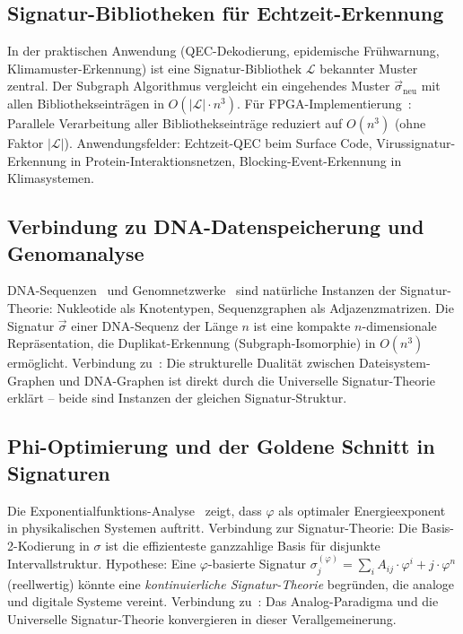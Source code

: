 ﻿\documentclass[a4paper,12pt]{article}
\theoremstyle{definition}
\begin{document}
\subsection{Signatur-Bibliotheken f\"ur Echtzeit-Erkennung}

In der praktischen Anwendung (QEC-Dekodierung, epidemische Fr\"uhwarnung,
Klimamuster-Erkennung) ist eine Signatur-Bibliothek $\mathcal{L}$
bekannter Muster zentral.
Der Subgraph Algorithmus vergleicht ein eingehendes Muster $\vec{\sigma}_{\text{neu}}$
mit allen Bibliothekseintr\"agen in $O(|\mathcal{L}| \cdot n^3)$.
F\"ur FPGA-Implementierung~\cite{epp2026fpga}: Parallele Verarbeitung aller
Bibliothekseintr\"age reduziert auf $O(n^3)$ (ohne Faktor $|\mathcal{L}|$).
Anwendungsfelder: Echtzeit-QEC beim Surface Code, Virussignatur-Erkennung
in Protein-Interaktionsnetzen, Blocking-Event-Erkennung in Klimasystemen.

\subsection{Verbindung zu DNA-Datenspeicherung und Genomanalyse}

DNA-Sequenzen~\cite{epp2026dna} und Genomnetzwerke~\cite{epp2026gen}
sind nat\"urliche Instanzen der Signatur-Theorie: Nukleotide als
Knotentypen, Sequenzgraphen als Adjazenzmatrizen.
Die Signatur $\vec{\sigma}$ einer DNA-Sequenz der L\"ange $n$ ist eine
kompakte $n$-dimensionale Repr\"asentation, die Duplikat-Erkennung
(Subgraph-Isomorphie) in $O(n^3)$ erm\"oglicht.
Verbindung zu~\cite{epp2026dusgrxdnastr}: Die strukturelle Dualit\"at zwischen
Dateisystem-Graphen und DNA-Graphen ist direkt durch die Universelle
Signatur-Theorie erkl\"art -- beide sind Instanzen der gleichen Signatur-Struktur.

\subsection{Phi-Optimierung und der Goldene Schnitt in Signaturen}

Die Exponentialfunktions-Analyse~\cite{epp2026expl} zeigt, dass $\varphi$ als
optimaler Energieexponent in physikalischen Systemen auftritt.
Verbindung zur Signatur-Theorie: Die Basis-2-Kodierung in $\sigma$ ist
die effizienteste ganzzahlige Basis f\"ur disjunkte Intervallstruktur.
Hypothese: Eine $\varphi$-basierte Signatur
$\sigma_j^{(\varphi)} = \sum_i A_{ij} \cdot \varphi^i + j \cdot \varphi^n$
(reellwertig) k\"onnte eine \emph{kontinuierliche Signatur-Theorie}
begr\"unden, die analoge und digitale Systeme vereint.
Verbindung zu~\cite{epp2026analog}: Das Analog-Paradigma und die Universelle
Signatur-Theorie konvergieren in dieser Verallgemeinerung.
\end{document}
